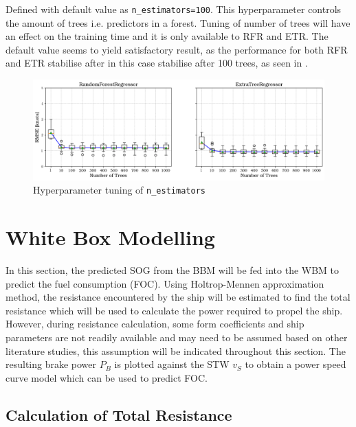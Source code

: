 Defined with default value as {\tt n\_estimators=100}. This hyperparameter controls the amount of trees i.e. predictors in a forest. Tuning of number of trees will have an effect on the training time and it is only available to RFR and ETR. The default value seems to yield satisfactory result, as the performance for both RFR and ETR stabilise after in this case stabilise after 100 trees, as seen in . 

\begin{figure}[h]
    \centering
        \includegraphics[width=.95\textwidth]{02_figures/hpo_n_estimators.png}
        \caption{Hyperparameter tuning of {\tt n\_estimators}}
        \label{fig:n_estimators}
\end{figure}



\section{White Box Modelling}\label{sec:WBM_modelling}

In this section, the predicted SOG from the BBM will be fed into the WBM to predict the fuel consumption (FOC). Using Holtrop-Mennen approximation method, the resistance encountered by the ship will be estimated to find the total resistance which will be used to calculate the power required to propel the ship. However, during resistance calculation, some form coefficients and ship parameters are not readily available and may need to be assumed based on other literature studies, this assumption will be indicated throughout this section. The resulting brake power $P_B$ is plotted against the STW $v_S$ to obtain a power speed curve model which can be used to predict FOC. 

\subsection{Calculation of Total Resistance}\label{sec:Rtot_calc}

